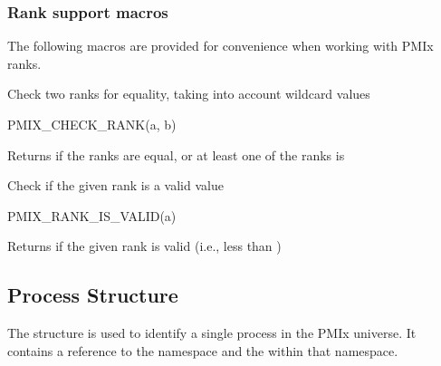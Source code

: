 \subsubsection{Rank support macros}

The following macros are provided for convenience when working with \ac{PMIx} ranks.


Check two ranks for equality, taking into account wildcard values

\cspecificstart
\begin{codepar}
PMIX_CHECK_RANK(a, b)
\end{codepar}
\cspecificend

\begin{arglist}
\end{arglist}

Returns  if the ranks are equal, or at least one of the ranks is 


Check if the given rank is a valid value

\cspecificstart
\begin{codepar}
PMIX_RANK_IS_VALID(a)
\end{codepar}
\cspecificend

\begin{arglist}
\end{arglist}

Returns  if the given rank is valid (i.e., less than )

\subsection{Process Structure}

The  structure is used to identify a single process in the PMIx universe.
It contains a reference to the namespace and the  within that namespace.


